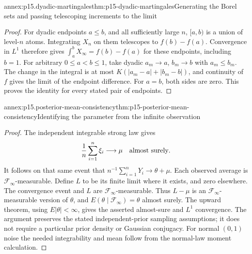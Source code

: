 \begin{annexitem}{annex:p15.dyadic-martingales}{thm:p15-dyadic-martingales}{Generating the Borel sets and passing telescoping increments to the limit}
\begin{proof}
For dyadic endpoints \(a\leq b\), and all sufficiently large \(n\),
\([a,b)\) is a union of level-\(n\) atoms. Integrating \(X_n\) on them
telescopes to \(f(b)-f(a)\). Convergence in \(L^1\) therefore gives
\(\int_a^b X_\infty=f(b)-f(a)\) for these endpoints, including \(b=1\).
For arbitrary \(0\leq a<b\leq1\), take dyadic \(a_m\to a\),
\(b_m\to b\) with \(a_m\leq b_m\).
The change in the integral is at most
\(K(|a_m-a|+|b_m-b|)\), and continuity of \(f\) gives the limit of
the endpoint difference. For \(a=b\), both sides are zero.
This proves the identity for every stated pair of endpoints.
\end{proof}
\end{annexitem}

\begin{annexitem}{annex:p15.posterior-mean-consistency}{thm:p15-posterior-mean-consistency}{Identifying the parameter from the infinite observation}
\begin{proof}
The independent integrable strong law gives
\[
             \frac1n\sum_{i=1}^n\xi_i\longrightarrow\mu
                                      \quad\hbox{almost surely}.
\]
It follows on that same event that
\(n^{-1}\sum_{i=1}^nY_i\to\theta+\mu\).
Each observed average is \(\mathcal F_\infty\)-measurable.
Define \(L\) to be its finite limit where it exists, and zero elsewhere.
The convergence event and \(L\) are \(\mathcal F_\infty\)-measurable.
Thus \(L-\mu\) is an \(\mathcal F_\infty\)-measurable version of \(\theta\),
and \(E(\theta\mid\mathcal F_\infty)=\theta\) almost surely.
The upward theorem, using \(E|\theta|<\infty\), gives
the asserted almost-sure and \(L^1\) convergence.
The argument preserves the stated independent-prior sampling assumptions;
it does not require a particular prior density or Gaussian conjugacy.
For normal \((0,1)\) noise the needed integrability and mean follow
from the normal-law moment calculation.
\end{proof}
\end{annexitem}

